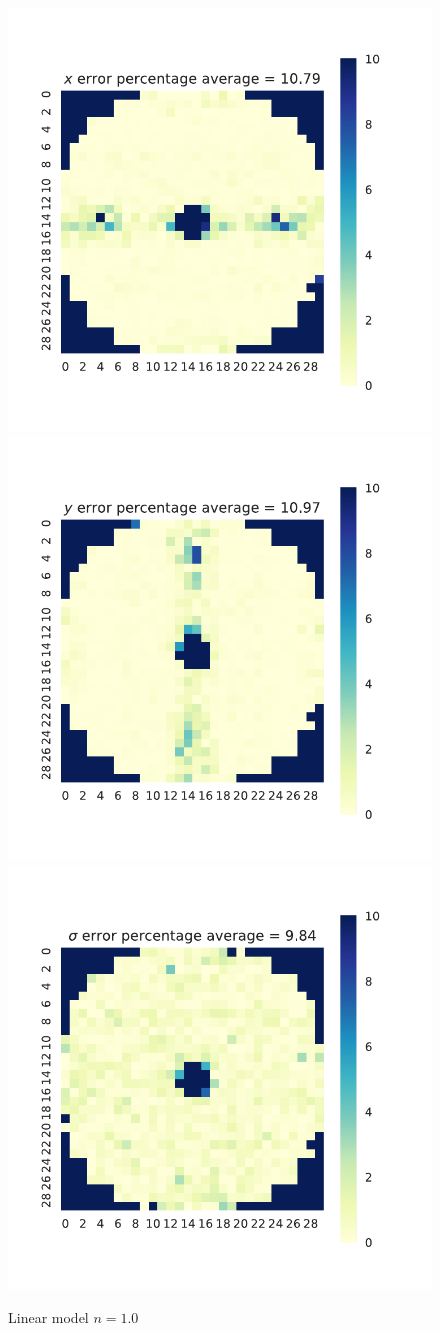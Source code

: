 \documentclass[]{article}
\begin{document}
\begin{figure}[htp]
	\centering
	\includegraphics[width=.32\textwidth]{x_10}
	\includegraphics[width=.32\textwidth]{y_10}
	\includegraphics[width=.32\textwidth]{sigma_10}
	\vspace{-0.5cm}
	\caption{Linear model $n=1.0$}
\end{figure}











\end{document}
